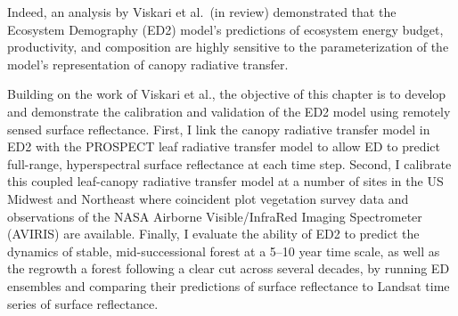 Indeed, an analysis by Viskari et al.\ (in review) \nocite{Viskari_inreview_ED} demonstrated that the Ecosystem Demography (ED2) model's predictions of ecosystem energy budget, productivity, and composition are highly sensitive to the parameterization of the model's representation of canopy radiative transfer.
% 
% 
% 

Building on the work of Viskari et al., the objective of this chapter is to develop and demonstrate the calibration and validation of the ED2 model using remotely sensed surface reflectance.
First, I link the canopy radiative transfer model in ED2 with the PROSPECT leaf radiative transfer model to allow ED to predict full-range, hyperspectral surface reflectance at each time step.
Second, I calibrate this coupled leaf-canopy radiative transfer model at a number of sites in the US Midwest and Northeast where coincident plot vegetation survey data and observations of the NASA Airborne Visible/InfraRed Imaging Spectrometer (AVIRIS) are available.
Finally, I evaluate the ability of ED2 to predict the dynamics of stable, mid-successional forest at a 5--10 year time scale, as well as the regrowth a forest following a clear cut across several decades, by running ED ensembles and comparing their predictions of surface reflectance to Landsat time series of surface reflectance.
